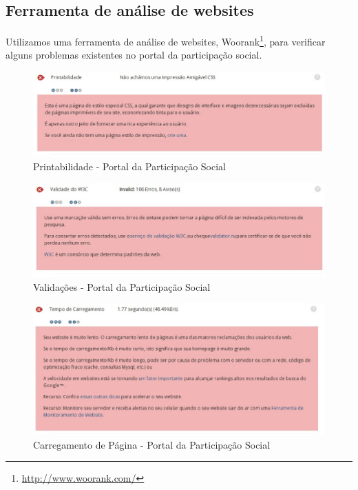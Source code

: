 \subsection {Ferramenta de análise de websites}

Utilizamos uma ferramenta de análise de websites, Woorank\footnote{\url{http://www.woorank.com/}}, para verificar alguns problemas existentes no portal da participação social.

\begin{figure}[!h]
    \centering
    \includegraphics[keepaspectratio=true,scale=0.60]
      {figuras/printabilidade.eps}
    \caption{Printabilidade - Portal da Participação Social}
    \label{printabilidade}
\end{figure}

\begin{figure}[!h]
    \centering
    \includegraphics[keepaspectratio=true,scale=0.60]
      {figuras/validacoes.eps}
    \caption{Validações - Portal da Participação Social}
    \label{validacoes}
\end{figure}

\begin{figure}[!h]
    \centering
    \includegraphics[keepaspectratio=true,scale=0.60]
      {figuras/carregamento.eps}
    \caption{Carregamento de Página - Portal da Participação Social}
    \label{carregamento}
\end{figure}

